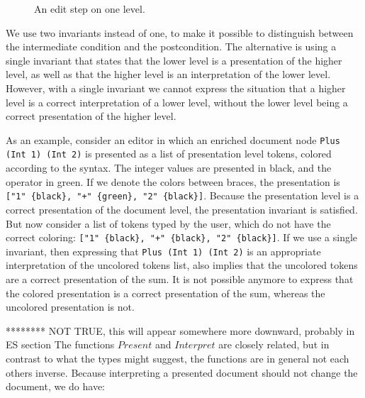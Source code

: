\begin{figure}
\begin{small}
\begin{center}
\begin{center}
\end{center}\caption{An edit step on one level.}\label{layerEditProcess} 
\end{center}
\end{small}
\end{figure}

We use two invariants instead of one, to make it possible to distinguish between the intermediate condition and the postcondition. The alternative is using a single invariant that states that the lower level is a presentation of the higher level, as well as that the higher level is an interpretation of the lower level. However, with a single invariant we cannot express the situation that a higher level is a correct interpretation of a lower level, without the lower level being a correct presentation of the higher level.

As an example, consider an editor in which an enriched document node \verb|Plus (Int 1) (Int 2)| is presented as a list of presentation level tokens, colored according to the syntax. The integer values are presented in black, and the operator in green. If we denote the colors between braces, the presentation is \verb|["1" {black}, "+" {green}, "2" {black}]|. Because the presentation level is a correct presentation of the document level, the presentation invariant is satisfied. But now consider a list of tokens typed by the user, which do not have the correct coloring: \verb|["1" {black}, "+" {black}, "2" {black}]|. If we use a single invariant, then expressing that \verb|Plus (Int 1) (Int 2)| is an appropriate interpretation of the uncolored tokens list, also implies that the uncolored tokens are a correct presentation of the sum. It is not possible anymore to express that the colored presentation is a correct presentation of the sum, whereas the uncolored presentation is not. 

\bc
{}
******** NOT TRUE, this will appear somewhere more downward, probably in ES section
The functions $Present$ and $Interpret$ are closely related, but in contrast to what the types might suggest, the functions are in general not each others inverse. Because interpreting a presented document should not change the document, we do have: 

